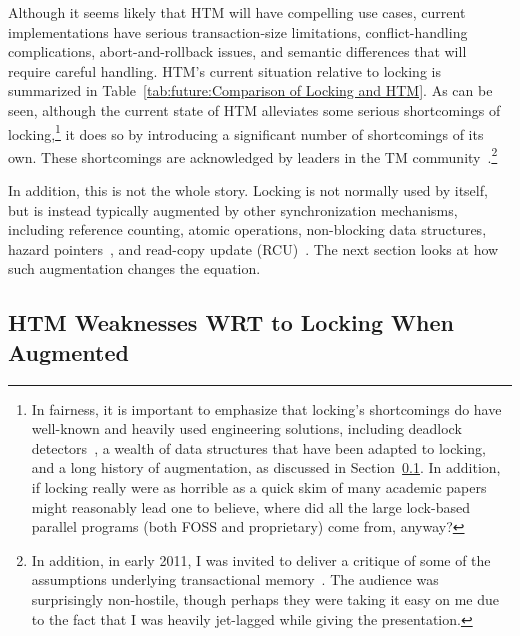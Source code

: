 Although it seems likely that HTM will have compelling use cases,
current implementations have serious transaction-size limitations,
conflict-handling complications, abort-and-rollback issues, and
semantic differences that will require careful handling.
HTM's current situation relative to locking is summarized in
Table~\ref{tab:future:Comparison of Locking and HTM}.
As can be seen, although the current state of HTM alleviates some
serious shortcomings of locking,\footnote{
	In fairness, it is important to emphasize that locking's shortcomings
	do have well-known and heavily used engineering solutions, including
	deadlock detectors~\cite{JonathanCorbet2006lockdep}, a wealth
	of data structures that have been adapted to locking, and
	a long history of augmentation, as discussed in
	Section~\ref{sec:future:HTM Weaknesses WRT to Locking When Augmented}.
	In addition, if locking really were as horrible as a quick skim
	of many academic papers might reasonably lead one to believe,
	where did all the large lock-based parallel programs (both
	FOSS and proprietary) come from, anyway?}
it does so by introducing a significant
number of shortcomings of its own.
These shortcomings are acknowledged by leaders in the TM
community~\cite{AlexanderMatveev2012PessimisticTM}.\footnote{
	In addition, in early 2011, I was invited to deliver a critique of
	some of the assumptions underlying transactional
	memory~\cite{PaulEMcKenney2011Verico}.
	The audience was surprisingly non-hostile, though perhaps they
	were taking it easy on me due to the fact that I was heavily
	jet-lagged while giving the presentation.}

In addition, this is not the whole story.
Locking is not normally used by itself, but is instead typically
augmented by other synchronization mechanisms,
including reference counting, atomic operations, non-blocking data structures,
hazard pointers~\cite{MagedMichael04a,HerlihyLM02},
and read-copy update (RCU)~\cite{McKenney98,McKenney01a,ThomasEHart2007a,PaulEMcKenney2012ELCbattery}.
The next section looks at how such augmentation changes the equation.

\subsection{HTM Weaknesses WRT to Locking When Augmented}
\label{sec:future:HTM Weaknesses WRT to Locking When Augmented}



